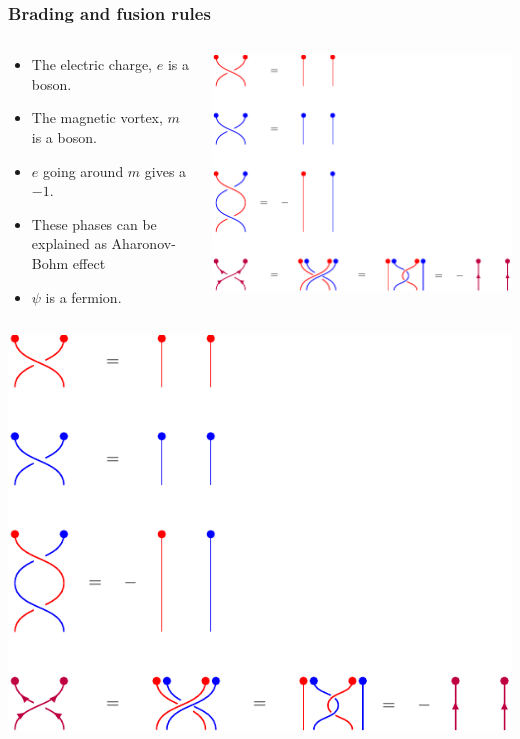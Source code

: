 \documentclass{beamer}
\renewcommand{\(}{\left(}
\renewcommand{\)}{\right)}
\renewcommand{\[}{\left[}
\renewcommand{\]}{\right]}
\begin{document}
\begin{frame}
    \frametitle{Brading and fusion rules}
    \begin{columns}
        \begin{column}{0.6\textwidth}
            \begin{itemize}
                \item The electric charge, $e$ is a boson. 
                \item The magnetic vortex, $m$ is a boson. 
                \item $e$ going around $m$ gives a $-1$. 
                \item These phases can be explained as Aharonov-Bohm effect
                \item $\psi$ is a fermion.
            \end{itemize}
        \end{column}
        \begin{column}{0.4\textwidth}
            \includegraphics[scale=0.9, trim=0 60 170 0, clip]{rules_of_braiding.pdf}
        \end{column}
    \end{columns}
    \vspace{10pt}
    \includegraphics[scale=1, trim=0 0 0 190, clip]{rules_of_braiding.pdf}
\end{frame}
\end{document}

